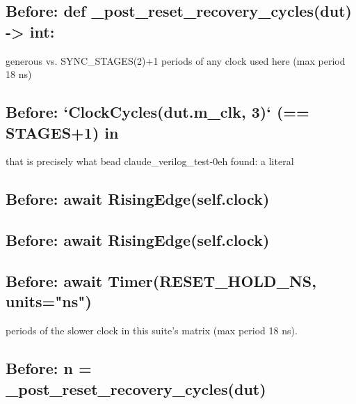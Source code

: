 \begin{record}

\subsection*{Before: def \_post\_reset\_recovery\_cycles(dut) -> int:}

\begin{textblock}
generous vs. SYNC_STAGES(2)+1 periods of any clock used here (max period 18 ns)
\end{textblock}

\subsection*{Before: `ClockCycles(dut.m\_clk, 3)` (== STAGES+1) in}

\begin{textblock}
that is precisely what bead claude_verilog_test-0eh found: a literal
\end{textblock}

\subsection*{Before: await RisingEdge(self.clock)}


\subsection*{Before: await RisingEdge(self.clock)}


\subsection*{Before: await Timer(RESET\_HOLD\_NS, units="ns")}

\begin{textblock}
periods of the slower clock in this suite's matrix (max period 18 ns).
\end{textblock}

\subsection*{Before: n = \_post\_reset\_recovery\_cycles(dut)}


\end{record}
